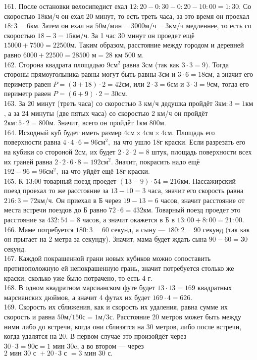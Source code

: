 161. После остановки велосипедист ехал $12:20-0:30-0:20-10:00=1:30.$ Со скоростью 18км/ч он ехал 20 минут, то есть треть часа, за это время он проехал $18:3=6$км. Затем он ехал на $50\text{м/мин}=3000\text{м/ч}=3$км/ч медленнее, то есть со скоростью $18-3=15$км/ч. За 1 час 30 минут он проедет ещё $15000+7500=22500$м. Таким образом, расстояние между городом и деревней равно $6000+22500=28500\text{ м}=28\text{ км }500\text{ м.}$\\
162. Сторона квадрата площадью $9\text{см}^2$ равна 3см (так как $3\cdot3=9).$ Тогда стороны прямоугольника равны могут быть равны 3см и $3\cdot6=18$см, а значит его периметр равен $P=(3+18)\cdot2=42$см, или $2\cdot3=6$см и $3\cdot3=9$см, тогда его периметр равен $P=(6+9)\cdot2=30$см.\\
163. За 20 минут (треть часа) со скоростью 3 км/ч дедушка пройдёт $3\text{км}:3=1\text{км}$, а за 24 минуты (две пятых часа) со скоростью 2 км/ч он пройдёт $2\text{км}:5\cdot2=800$м. Значит, всего он пройдёт 1км 800м.\\
164. Исходный куб будет иметь размер $4\text{см}\times4\text{см}\times4\text{см}.$ Площадь его поверхности равна $4\cdot4\cdot6=96\text{см}^2,$ на что ушло 18г краски. Если разрезать его на кубики со стороной 2см, их будет $2\cdot2\cdot2=8$ штук, площадь поверхности всех их граней равна $2\cdot2\cdot6\cdot8=192\text{см}^2.$ Значит, покрасить надо ещё $192-96=96\text{см}^2,$ на что уйдёт ещё 18г краски.\\
165. К 13:00 товарный поезд проедет $(13-9)\cdot54=216$км. Пассажирский поезд проехал то же расстояние за $13-10=3$ часа, значит его скорость равна $216:3=72$км/ч. Он приехал в Б через $19-13=6$ часов, значит расстояние от места встречи поездов до Б равно $72\cdot6=432$км. Товарный поезд проедет это расстояние за $432:54=8$ часов, а значит окажется в Б в $13:00+8:00=21:00.$\\
166. Маме потребуется $180:3=60$ секунд, а сыну --- $180:2=90$ секунд (так как он прыгает на 2 метра за секунду). Значит, мама будет ждать сына $90-60=30$ секунд.\\
167. Каждой покрашенной грани новых кубиков можно сопоставить противоположную ей непокрашенную грань, значит потребуется столько же краски, сколько уже было потрачено, то есть 4 г.\\
168. В одном квадратном марсианском футе будет $13\cdot13=169$ квадратных марсианских дюймов, а значит 4 футах их будет $169\cdot4=626.$\\
169. Скорость их сближения, как и скорость их удаления, равна сумме их скорость и равна $50\text{м}/150\text{с}=1\text{м}/3\text{с}.$ Расстояние 20 метров может быть между ними либо до встречи, когда они сблизятся на 30 метров, либо после встречи, когда удалятся на 20. В первом случае это произойдёт через $30\cdot3=90\text{с}=1\text{ мин }30$c, а во втором --- через $2\text{ мин }30\text{ с }+20\cdot3\text{ с }=3\text{ мин }30\text{ с.}$\\
